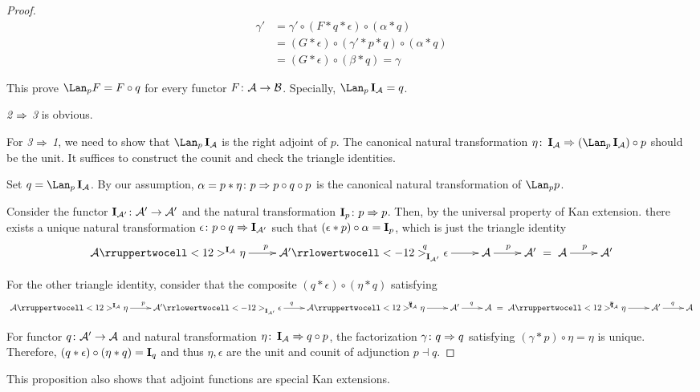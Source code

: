 \begin{proof}
      \begin{align*}
        \gamma' &= \gamma'\circ(F\ast q\ast\epsilon)\circ(\alpha\ast q) \\
                         &= (G\ast\epsilon)\circ(\gamma'\ast p\ast q)\circ(\alpha\ast q)\\
                         &= (G\ast\epsilon)\circ(\beta\ast q) = \gamma
      \end{align*}

      This prove $\Lan_pF=F\circ q$ for every functor $F\colon{\cal A}\to{\cal B}$. Specially, $\Lan_p\Id_{\Aa}=q$.

      \emph{2} $\Rightarrow$ \emph{3} is obvious.

      For \emph{3} $\Rightarrow$ \emph{1}, we need to show that $\Lan_p\Id_{\Aa}$ is the right adjoint of $p$. The canonical natural transformation $\eta\colon\Id_{\Aa}\then(\Lan_p\Id_{\Aa})\circ p$ should be the unit. It suffices to construct the counit and check the triangle identities.

      Set $q=\Lan_p\Id_{\Aa}$.
      By our assumption, $\alpha=p\ast\eta\colon p\Rightarrow p\circ q\circ p$ is the canonical natural transformation of $\Lan_pp$.

      Consider the functor $\operatorname{\mathbf{I}}_{{\cal A}'}\colon{\cal A}'\to{\cal A}'$ and the natural transformation $\operatorname{\mathbf{I}}_p\colon p\Rightarrow p$. Then, by the universal property of Kan extension. there exists a unique natural transformation $\epsilon\colon p\circ q\Rightarrow\operatorname{\mathbf{I}}_{{\cal A}'}$ such that $(\epsilon\ast p)\circ\alpha=\operatorname{\mathbf{I}}_p$, which is just the triangle identity
      \begin{displaymath}
        \xymatrix{
          \Aa\ar[r]^p\rruppertwocell<12>^{\Id_{\Aa}}_{}{\eta}&\Aa'\ar[r]^q\rrlowertwocell<-12>^{}_{\Id_{\Aa'}}{\epsilon}&\Aa\ar[r]^p&\Aa'
         }
         =
        \xymatrix{
          \Aa\ar[r]^p&\Aa'
         }
      \end{displaymath}

      For the other triangle identity, consider that the composite $(q\ast\epsilon)\circ(\eta\ast q)$ satisfying
      \begin{displaymath}
        \xymatrix{
          \Aa\ar[r]^p\rruppertwocell<12>^{\Id_{\Aa}}_{}{\eta}&\Aa'\ar[r]^q\rrlowertwocell<-12>^{}_{\Id_{\Aa'}}{\epsilon}
          &\Aa\ar[r]^p\rruppertwocell<12>^{\Id_{\Aa}}_{}{\eta}&\Aa'\ar[r]^q&\Aa
         }
         =
        \xymatrix{
          \Aa\ar[r]^p\rruppertwocell<12>^{\Id_{\Aa}}_{}{\eta}&\Aa'\ar[r]^q&\Aa
         }
      \end{displaymath}

      For functor $q\colon{\cal A}'\to{\cal A}$ and natural transformation $\eta\colon\operatorname{\mathbf{I}}_{{\cal A}}\Rightarrow q\circ p$, the factorization $\gamma\colon q\Rightarrow q$ satisfying $(\gamma\ast p)\circ \eta=\eta$ is unique. Therefore, $(q\ast\epsilon)\circ(\eta\ast q)=\operatorname{\mathbf{I}}_q$ and thus $\eta,\epsilon$ are the unit and counit of adjunction $p\dashv q$.
  \end{proof}
  \begin{rem}
    This proposition also shows that adjoint functions are special Kan extensions.
  \end{rem}


